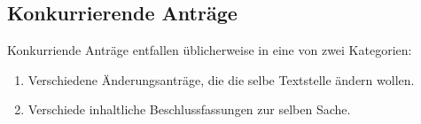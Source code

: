 \documentclass[12pt,oneside]{scrartcl}
\begin{document}
\subsection{Konkurrierende Anträge%
  \label{konkurrierende-antrage}%
}

Konkurriende Anträge entfallen üblicherweise in eine von zwei Kategorien:

\begin{enumerate}
\item Verschiedene Änderungsanträge, die die selbe Textstelle ändern wollen.

\item Verschiede inhaltliche Beschlussfassungen zur selben Sache.
\end{enumerate}
\end{document}
